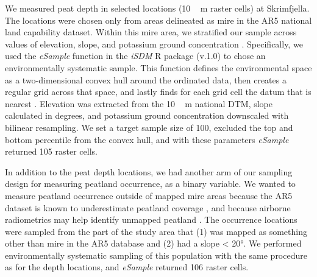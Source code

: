 \documentclass[soil, manuscript]{copernicus}
\begin{document}
We measured peat depth in selected locations (\unit{10\,m} raster cells) at Skrimfjella.
The locations were chosen only from areas delineated as mire in the AR5 national land capability dataset.
Within this mire area, we stratified our sample across values of elevation, slope, and potassium ground concentration \citep[from processed airborne gamma ray spectrometry,][]{baranwalHelicopterborneMagneticElectromagnetic2013}.
Specifically, we used the \emph{eSample} function in the \emph{iSDM} R package (v.1.0) to chose an environmentally systematic sample.
This function defines the environmental space as a two-dimensional convex hull around the ordinated data, then creates a regular grid across that space, and lastly finds for each grid cell the datum that is nearest \citep{hattabUnifiedFrameworkModel2017}.
Elevation was extracted from the \unit{10\,m} national DTM, slope calculated in degrees, and potassium ground concentration downscaled with bilinear resampling.
We set a target sample size of 100, excluded the top and bottom percentile from the convex hull, and with these parameters \emph{eSample} returned 105 raster cells.

In addition to the peat depth locations, we had another arm of our sampling design for measuring peatland occurrence, as a binary variable.
We wanted to measure peatland occurrence outside of mapped mire areas because the AR5 dataset is known to underestimate peatland coverage \citep[especially in forests,][]{brynLandCoverNorway2018}, and because airborne radiometrics may help identify unmapped peatland \citep{gatisMappingUplandPeat2019, olearyDigitalSoilMapping2022}.
The occurrence locations were sampled from the part of the study area that (1) was mapped as something other than mire in the AR5 database and (2) had a slope \textless{} 20°.
We performed environmentally systematic sampling of this population with the same procedure as for the depth locations, and \emph{eSample} returned 106 raster cells.
\end{document}
